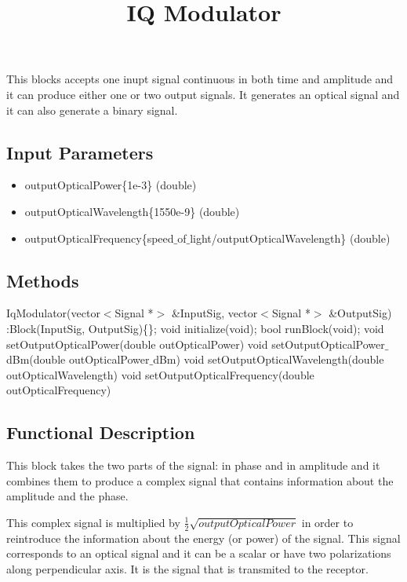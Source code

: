 \documentclass[a4paper]{article}
\title{IQ Modulator}
\begin{document}
\maketitle

This blocks accepts one inupt signal continuous in both time and amplitude and it can produce either one or two output signals. It generates an optical signal and it can also generate a binary signal. 

\subsection*{Input Parameters}

\begin{itemize}
	\item outputOpticalPower\{1e-3\} \linebreak
	(double)
	\item outputOpticalWavelength\{1550e-9\} \linebreak (double)
	\item outputOpticalFrequency\{speed$\_$of$\_$light/outputOpticalWavelength\} \linebreak
	(double)
\end{itemize}

\subsection*{Methods}

IqModulator(vector$<$Signal *$>$ \&InputSig, vector$<$Signal *$>$ \&OutputSig) :Block(InputSig, OutputSig)\{\};
\bigbreak
void initialize(void);
\bigbreak
bool runBlock(void);
\bigbreak
void setOutputOpticalPower(double outOpticalPower) 
\bigbreak
void setOutputOpticalPower$\_$dBm(double outOpticalPower$\_$dBm) 
\bigbreak
void setOutputOpticalWavelength(double outOpticalWavelength) 
\bigbreak
void setOutputOpticalFrequency(double outOpticalFrequency) 

\subsection*{Functional Description}

This block takes the two parts of the signal: in phase and in amplitude and it combines them to produce a complex signal that contains information about the amplitude and the phase.

This complex signal is multiplied by $\frac{1}{2}\sqrt{\textit{outputOpticalPower}}$ in order to reintroduce the information about the energy (or power) of the signal. This signal corresponds to an optical signal and it can be a scalar or have two polarizations along perpendicular axis. It is the signal that is transmited to the receptor. 
\end{document}
